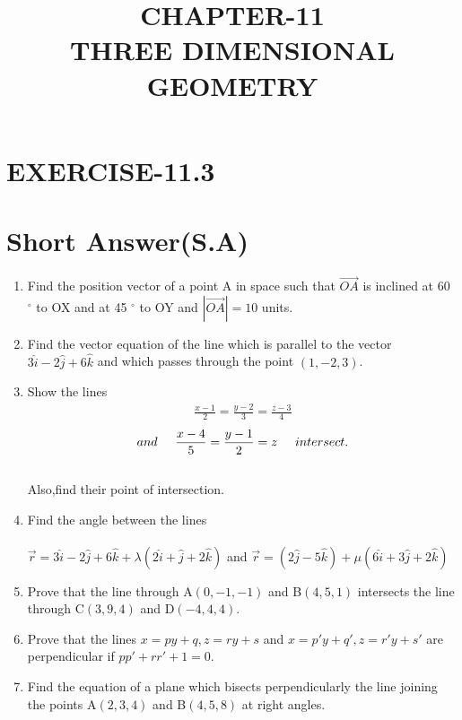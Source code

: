\documentclass[12pt]{article}
\begin{document}
\title{\textbf{CHAPTER-11 \\THREE DIMENSIONAL GEOMETRY}}
\maketitle
\begin{center}
\end{center}
\section*{EXERCISE-11.3}
\section*{Short Answer(S.A)}
\begin{enumerate}

\item  Find the position vector of a point A in space such that $\overrightarrow{OA}$ is inclined at 60 $^{\circ}$ to OX and at 45 $^{\circ}$ to OY and $|\overrightarrow{OA}| =10$ units.
\item  Find the vector equation of the line which is parallel to the vector $3\hat{i}-2\hat{j}+6\hat{k}$ and which passes through the point $(1,-2,3)$.
\item Show the lines
\begin{align*}
\frac{x-1}{2}=\frac{y-2}{3}=\frac{z-3}{4}
\end{align*}
\begin{align*}
and  \hspace{0.5cm} \frac{x-4}{5}=\frac{y-1}{2}=z \hspace{0.5cm} intersect.
\end{align*}
\\ Also,find their point of intersection.
\item Find the angle between the lines \\\\ $\overrightarrow{r}=3\hat{i}-2\hat{j}+6\hat{k}+\lambda(2\hat{i}+\hat{j}+2\hat{k})$ and $\overrightarrow{r}=(2\hat{j}-5\hat{k})+\mu(6\hat{i}+3\hat{j}+2\hat{k})$
\item Prove that the line through A$(0,-1,-1)$ and B$(4,5,1)$ intersects the line through C$(3,9,4)$ and D$(-4,4,4)$.
\item Prove that the lines $x=py+q , z=ry+s$ and $x=p'y+q', z=r'y+s'$ are perpendicular if $pp'+rr'+1=0$.
\item Find the equation of a plane which  bisects perpendicularly the line joining the points A$(2,3,4)$ and B$(4,5,8)$ at right angles.

\end{enumerate}
\end{document}
